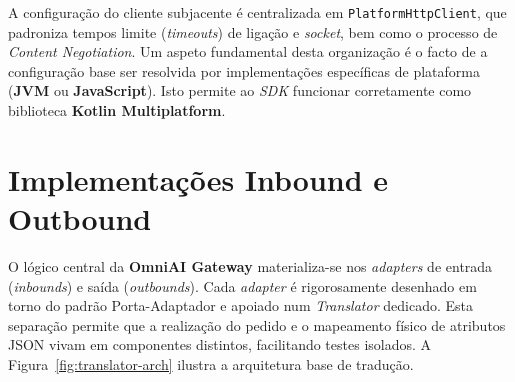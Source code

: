     A configuração do cliente subjacente é centralizada em \texttt{PlatformHttpClient}, que padroniza tempos limite (\textit{timeouts}) de ligação e \textit{socket}, bem como o processo de \textit{Content Negotiation}. Um aspeto fundamental desta organização é o facto de a configuração base ser resolvida por implementações específicas de plataforma (\textbf{JVM} ou \textbf{JavaScript}). Isto permite ao \textit{SDK} funcionar corretamente como biblioteca \textbf{Kotlin Multiplatform}.


    \section{Implementações Inbound e Outbound}
    \label{sec:inbounds-outbounds}
    
    O lógico central da \textbf{OmniAI Gateway} materializa-se nos \textit{adapters} de entrada (\textit{inbounds}) e saída (\textit{outbounds}). Cada \textit{adapter} é rigorosamente desenhado em torno do padrão Porta-Adaptador e apoiado num \textit{Translator} dedicado. Esta separação permite que a realização do pedido e o mapeamento físico de atributos JSON vivam em componentes distintos, facilitando testes isolados. A Figura~\ref{fig:translator-arch} ilustra a arquitetura base de tradução.
